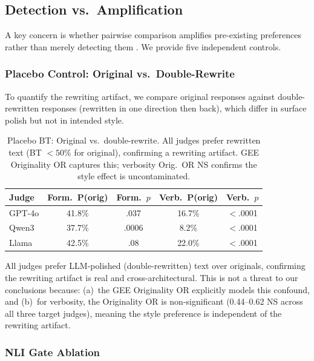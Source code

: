 \documentclass[11pt,a4paper]{article}
\begin{document}
\subsection{Detection vs.\ Amplification}
\label{sec:amplification}

A key concern is whether pairwise comparison amplifies pre-existing preferences rather than merely detecting them \citep{jeong2025comparative}. We provide five independent controls.

\subsubsection{Placebo Control: Original vs.\ Double-Rewrite}
\label{sec:placebo}

To quantify the rewriting artifact, we compare original responses against double-rewritten responses (rewritten in one direction then back), which differ in surface polish but not in intended style.

\begin{table}[t]
\centering
\small
\caption{Placebo BT: Original vs.\ double-rewrite. All judges prefer rewritten text (BT $< 50\%$ for original), confirming a rewriting artifact. GEE Originality OR captures this; verbosity Orig.\ OR NS confirms the style effect is uncontaminated.}
\label{tab:placebo}
\begin{tabular}{lcccc}
\toprule
\textbf{Judge} & \textbf{Form.\ P(orig)} & \textbf{Form.\ $p$} & \textbf{Verb.\ P(orig)} & \textbf{Verb.\ $p$} \\
\midrule
GPT-4o  & 41.8\% & .037   & 16.7\% & $<$.0001 \\
Qwen3   & 37.7\% & .0006  & 8.2\%  & $<$.0001 \\
Llama   & 42.5\% & .08    & 22.0\% & $<$.0001 \\
\bottomrule
\end{tabular}
\end{table}

All judges prefer LLM-polished (double-rewritten) text over originals, confirming the rewriting artifact is real and cross-architectural. This is not a threat to our conclusions because: (a)~the GEE Originality OR explicitly models this confound, and (b)~for verbosity, the Originality OR is non-significant (0.44--0.62 NS across all three target judges), meaning the style preference is independent of the rewriting artifact.

\subsubsection{NLI Gate Ablation}
\label{sec:nli-ablation}
\end{document}
